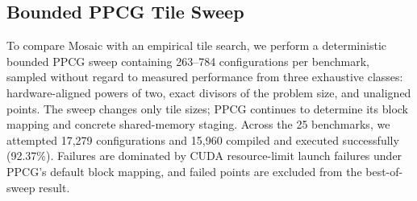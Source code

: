 \documentclass[acmsmall,review,anonymous,screen]{acmart}
\newcommand{\name}{{Mosaic}\xspace}
\providecommand{\DIFaddend}{} %
\DeclareRobustCommand{\DIFaddend}{\DIFOaddend \let\includegraphics\DIFOincludegraphics} %
\begin{document}
\DIFaddend \subsection{Bounded PPCG Tile Sweep}
\label{subsec:bounded-ppcg-sweep}

To compare \name with an empirical tile search, we perform a deterministic bounded PPCG sweep containing 263--784 configurations per benchmark, sampled without regard to measured performance from three exhaustive classes: hardware-aligned powers of two, exact divisors of the problem size, and unaligned points. The sweep changes only tile sizes; PPCG continues to determine its block mapping and concrete shared-memory staging. Across the 25 benchmarks, we attempted 17,279 configurations and 15,960 compiled and executed successfully (92.37\%). Failures are dominated by CUDA resource-limit launch failures under PPCG's default block mapping, and failed points are excluded from the best-of-sweep result.
\end{document}
